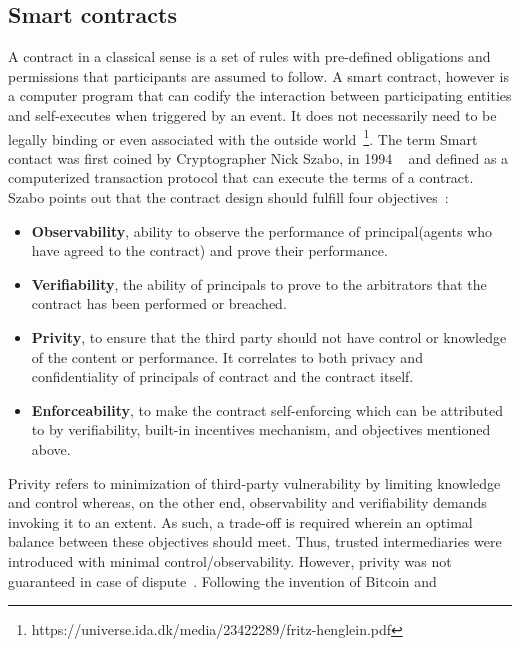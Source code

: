 \subsection{Smart contracts}
A contract in a classical sense is a set of rules with pre-defined obligations
and permissions that participants are assumed to follow. 
A smart contract, however is a computer program that can codify the
interaction between participating entities and self-executes when triggered by
an event. It does not necessarily need to be legally binding or even associated
with the outside world~\footnote{https://universe.ida.dk/media/23422289/fritz-henglein.pdf}.
The term Smart contact was first coined by Cryptographer Nick Szabo, in 1994
~\cite{SzaboSmart1994} and defined as a computerized transaction protocol that
can execute the terms of a contract. Szabo points out that the contract
design should fulfill four objectives~\cite{szabo1996smart}: \\
\begin{itemize}
	\item \textbf{Observability}, ability to observe the performance of
		principal(agents who have agreed to the contract) and prove their
		performance.\\
	\item \textbf{Verifiability}, the ability of principals to prove to the
		arbitrators that the contract has been performed or breached. \\ 
	\item \textbf{Privity}, to ensure that the third party should not have
		control or knowledge of the content or performance. It correlates to
		both privacy and confidentiality of principals of contract and the
		contract itself. \\
	\item \textbf{Enforceability}, to make the contract self-enforcing which
		can be attributed to by verifiability, built-in incentives mechanism,
		and objectives mentioned above. \\
\end{itemize}
Privity refers to minimization of third-party vulnerability by limiting
knowledge and control whereas, on the other end, observability and
verifiability demands invoking it to an extent. As such, a trade-off is
required wherein an optimal balance between these objectives should meet. Thus,
trusted intermediaries were introduced with minimal control/observability.
However, privity was not guaranteed in case of
dispute~\cite{szabo1997formalizing}. Following the invention of Bitcoin and
